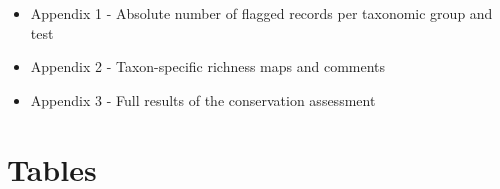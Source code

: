 \documentclass[fleqn,10pt,lineno]{wlpeerj} %
\begin{document}
\begin{itemize}
\item
  Appendix 1 - Absolute number of flagged records per taxonomic group and test
\item
  Appendix 2 - Taxon-specific richness maps and comments
\item
  Appendix 3 - Full results of the conservation assessment
\end{itemize}

\hypertarget{tables}{%
\section*{Tables}\label{tables}}

\begin{table}


\end{table}
\end{document}
